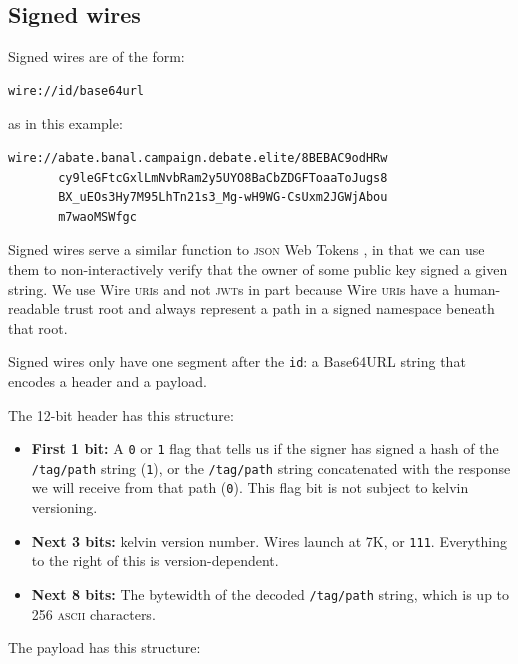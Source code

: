 \documentclass[twoside]{article}
\begin{document}
\subsection{Signed wires}\label{signed-wires}

Signed wires are of the form:

\begin{lstlisting}[style=listingblock]
wire://id/base64url
\end{lstlisting}

\noindent
as in this example:

\begin{lstlisting}[style=listingblock]
wire://abate.banal.campaign.debate.elite/8BEBAC9odHRw
       cy9leGFtcGxlLmNvbRam2y5UYO8BaCbZDGFToaaToJugs8
       BX_uEOs3Hy7M95LhTn21s3_Mg-wH9WG-CsUxm2JGWjAbou
       m7waoMSWfgc
\end{lstlisting}

Signed wires serve a similar function to \textsc{json} Web Tokens \citep{RFC7519}, in that we can
use them to non-interactively verify that the owner of some public key
signed a given string. We use Wire \textsc{uri}s and not \textsc{jwt}s in part because
Wire \textsc{uri}s have a human-readable trust root and always represent a path
in a signed namespace beneath that root.

Signed wires only have one segment after the \texttt{id}: a Base64URL
string that encodes a header and a payload.

The 12-bit header has this structure:

\begin{itemize}[noitemsep,topsep=2pt]

\item
  \textbf{First 1 bit:} A \texttt{0} or \texttt{1} flag that tells us if
  the signer has signed a hash of the \texttt{/tag/path} string
  (\texttt{1}), or the \texttt{/tag/path} string concatenated with the
  response we will receive from that path (\texttt{0}). This flag bit is
  not subject to kelvin versioning.
\item
  \textbf{Next 3 bits:} kelvin version number. Wires launch at 7K, or
  \texttt{111}. Everything to the right of this is version-dependent.
\item
  \textbf{Next 8 bits:} The bytewidth of the decoded \texttt{/tag/path}
  string, which is up to 256 \textsc{ascii} characters.
\end{itemize}

The payload has this structure:
\end{document}
